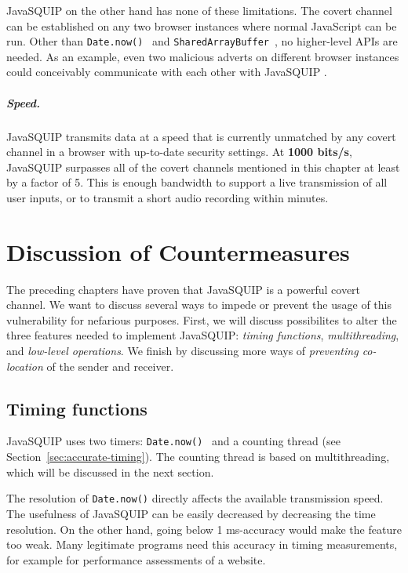\documentclass[11pt,
  titlepage=false,
]{scrreprt}
\begin{document}
JavaSQUIP on the other hand has none of these limitations.
The covert channel can be established on any two browser instances where normal JavaScript can be run.
Other than \texttt{Date.now()}~\cite{datenow} and \texttt{SharedArrayBuffer}~\cite{sharedarraybuffer},
no higher-level APIs are needed.
As an example, even two malicious adverts on different browser instances could conceivably communicate with each other
with JavaSQUIP .

\paragraph{Speed.}
JavaSQUIP transmits data at a speed that is currently unmatched by any covert channel in a browser with up-to-date security settings.
At \textbf{1000 bits/s}, JavaSQUIP surpasses all of the covert channels mentioned in this chapter at least by a factor of 5.
This is enough bandwidth to support a live transmission of all user inputs, or to transmit a short audio recording within minutes.

\pagebreak
\chapter{Discussion of Countermeasures}
\label{ch:countermeasures}

The preceding chapters have proven that JavaSQUIP is a powerful covert channel.
We want to discuss several ways to impede or prevent the usage of this vulnerability for nefarious purposes.
First, we will discuss possibilites to alter the three features needed to implement JavaSQUIP:
\textit{timing functions}, \textit{multithreading}, and \textit{low-level operations}.
We finish by discussing more ways of \textit{preventing co-location} of the sender and receiver.

\section{Timing functions}
JavaSQUIP uses two timers: \texttt{Date.now()}~\cite{datenow} and a counting thread (see Section~\ref{sec:accurate-timing}).
The counting thread is based on multithreading, which will be discussed in the next section.

The resolution of \texttt{Date.now()} directly affects the available transmission speed.
The usefulness of JavaSQUIP can be easily decreased by decreasing the time resolution.
On the other hand, going below 1 ms-accuracy would make the feature too weak.
Many legitimate programs need this accuracy in timing measurements,
for example for performance assessments of a website.
\end{document}
